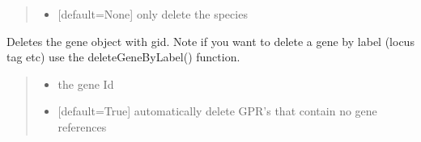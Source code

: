 \documentclass[letterpaper,12pt,english]{sphinxmanual}
\begin{document}
\begin{fulllineitems}
\begin{fulllineitems}
\begin{quote}
\begin{description}
\begin{itemize}
\item {} 
\sphinxAtStartPar
{} \textendash{} {[}default=None{]} only delete the species

\end{itemize}

\end{description}\end{quote}

\end{fulllineitems}


\begin{fulllineitems}
\label{\detokenize{api/core:cbmpy.CBModel.Model.deleteGene}}
\pysigstartsignatures
\pysiglinewithargsret
{}
{\sphinxparamcomma {}}
{}
\pysigstopsignatures
\sphinxAtStartPar
Deletes the gene object with gid. Note if you want to delete a gene by label (locus tag etc) use the deleteGeneByLabel() function.
\begin{quote}\begin{description}
\begin{itemize}
\item {} 
\sphinxAtStartPar
{} \textendash{} the gene Id

\item {} 
\sphinxAtStartPar
{} \textendash{} {[}default=True{]} automatically delete GPR’s that contain no gene references

\end{itemize}

\end{description}\end{quote}

\end{fulllineitems}



\end{fulllineitems}
\end{document}
